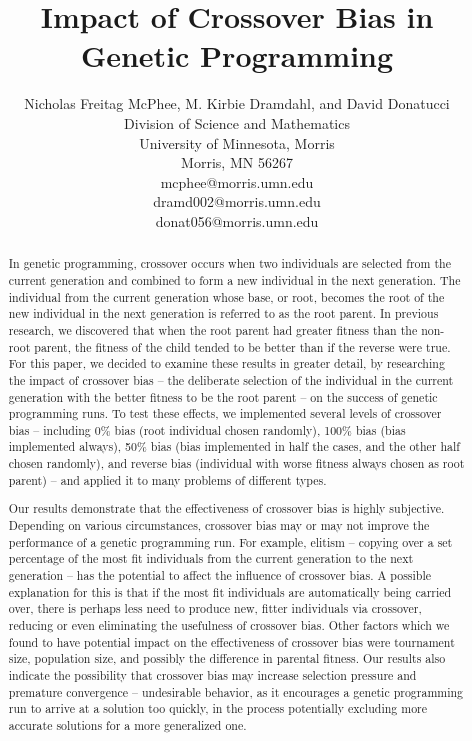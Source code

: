 \documentclass[12pt]{article}
\title{Impact of Crossover Bias in Genetic Programming}
\author{
 	Nicholas Freitag McPhee, M. Kirbie Dramdahl, and David Donatucci\\
        Division of Science and Mathematics\\
        University of Minnesota, Morris\\
        Morris, MN 56267\\
        mcphee@morris.umn.edu\\
        dramd002@morris.umn.edu\\
        donat056@morris.umn.edu\\
}
\date{}
\begin{document}
\pagestyle{plain}

\maketitle

\begin{abstract}

In genetic programming, crossover occurs when two individuals are selected from the current generation and 
combined to form a new individual in the next generation. The individual from the current generation whose 
base, or root, becomes the root of the new individual in the next generation is referred to as the root parent. In 
previous research, we discovered that when the root parent had greater fitness than the non-root parent, the 
fitness of the child tended to be better than if the reverse were true. For this paper, we decided to examine 
these results in greater detail, by researching the impact of crossover bias -- the deliberate selection of the 
individual in the current generation with the better fitness to be the root parent -- on the success of genetic 
programming runs. To test these effects, we implemented several levels of crossover bias -- including 0\% bias 
(root individual chosen randomly), 100\% bias (bias implemented always), 50\% bias (bias implemented in half 
the cases, and the other half chosen randomly), and reverse bias (individual with worse fitness always chosen 
as root parent) -- and applied it to many problems of different types.

Our results demonstrate that the effectiveness of crossover bias is highly subjective. Depending on various 
circumstances, crossover bias may or may not improve the performance of a genetic programming run. For 
example, elitism -- copying over a set percentage of the most fit individuals from the current generation to the 
next generation -- has the potential to affect the influence of crossover bias. A possible explanation for this is 
that if the most fit individuals are automatically being carried over, there is perhaps less need to produce new, 
fitter individuals via crossover, reducing or even eliminating the usefulness of crossover bias. Other factors 
which we found to have potential impact on the effectiveness of crossover bias were tournament size, 
population size, and possibly the difference in parental fitness. Our results also indicate the possibility that 
crossover bias may increase selection pressure and premature convergence -- undesirable behavior, as it 
encourages a genetic programming run to arrive at a solution too quickly, in the process potentially excluding 
more accurate solutions for a more generalized one.


\end{abstract}
\end{document}
